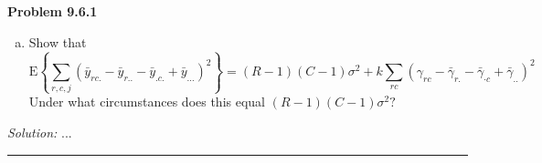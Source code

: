 \documentclass[a4paper, 11pt]{article}
\newenvironment{problem}[2][Problem]
    { \begin{mdframed}[backgroundcolor=gray!20] \textbf{#1 #2} \\}
    {  \end{mdframed}}
\newenvironment{solution}
    {\textit{Solution:}}
    {}
\begin{document}
\begin{problem}{9.6.1}
\begin{enumerate}[(a)]
    \item Show that
    $$\mathrm{E}\left\{\sum_{r, c, j}\left(\bar{y}_{r c .}-\bar{y}_{r . .}-\bar{y}_{.c .}+\bar{y}_{\ldots}\right)^{2}\right\}=(R-1)(C-1) \sigma^{2}+k \sum_{r c}\left(\gamma_{r c}-\bar{\gamma}_{r .}-\bar{\gamma}_{\cdot c}+\bar{\gamma}_{..}\right)^{2}$$
    Under what circumstances does this equal $(R-1)(C-1) \sigma^{2} ?$
  \end{enumerate}
\end{problem}
\begin{solution}
...
\end{solution}

\noindent\rule{7in}{2.8pt}

\end{document}

